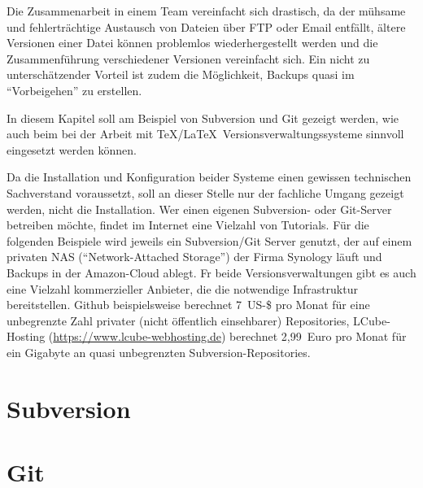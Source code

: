 Die Zusammenarbeit in einem Team vereinfacht sich drastisch, da der mühsame und fehlerträchtige Austausch von Dateien über FTP oder Email entfällt, ältere Versionen einer Datei können problemlos wiederhergestellt werden und die Zusammenführung verschiedener Versionen vereinfacht sich. Ein nicht zu unterschätzender Vorteil ist zudem die Möglichkeit, Backups quasi im \enquote{Vorbeigehen} zu erstellen.

In diesem Kapitel soll am Beispiel von Subversion und Git gezeigt werden, wie auch beim bei der Arbeit mit \TeX/\LaTeX\ Versionsverwaltungssysteme sinnvoll eingesetzt werden können.

Da die Installation und Konfiguration beider Systeme einen gewissen technischen Sachverstand voraussetzt, soll an dieser Stelle nur der fachliche Umgang gezeigt werden, nicht die Installation. Wer einen eigenen Subversion- oder Git-Server betreiben möchte, findet im Internet eine Vielzahl von Tutorials. Für die folgenden Beispiele wird jeweils ein Subversion/Git Server genutzt, der auf einem privaten NAS (\enquote{Network-Attached Storage}) der Firma Synology läuft und Backups in der Amazon-Cloud ablegt. Fr beide Versionsverwaltungen gibt es auch eine Vielzahl kommerzieller Anbieter, die die notwendige Infrastruktur bereitstellen. Github beispielsweise berechnet 7~US-\$ pro Monat für eine unbegrenzte Zahl privater (nicht öffentlich einsehbarer) Repositories, LCube-Hosting (\url{https://www.lcube-webhosting.de}) berechnet 2,99~Euro pro Monat für ein Gigabyte an quasi unbegrenzten Subversion-Repositories.

\section{Subversion}



\section{Git}


\endinput


